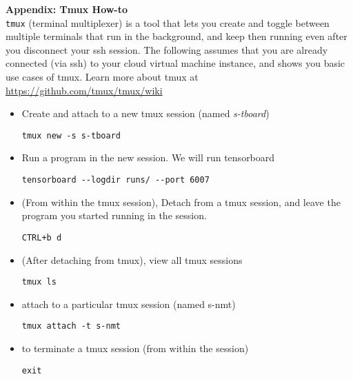 \newpage
\clearpage
\Large{\textbf{Appendix: Tmux How-to}}\\
\normalsize
\texttt{tmux} (terminal multiplexer) is a tool that lets you create and toggle between multiple terminals that run in the background, and keep then running even after you disconnect your ssh session.
%
The following assumes that you are already connected (via ssh) to your cloud virtual machine instance, and shows you basic use cases of tmux. Learn more about tmux at \href{https://github.com/tmux/tmux/wiki}{https://github.com/tmux/tmux/wiki}

\begin{itemize}
    \item  Create and attach to a new tmux session (named \emph{s-tboard})
\begin{lstlisting}
tmux new -s s-tboard
\end{lstlisting}
    \item Run a program in the new session. We will run tensorboard
\begin{lstlisting}
tensorboard --logdir runs/ --port 6007
\end{lstlisting}

\item (From within the tmux session), Detach from a tmux session, and leave the program you started running in the session.
\begin{lstlisting}
CTRL+b d
\end{lstlisting}

\item (After detaching from tmux), view all tmux sessions 
\begin{lstlisting}
tmux ls
\end{lstlisting}


\item attach to a particular tmux session (named s-nmt)
\begin{lstlisting}
tmux attach -t s-nmt
\end{lstlisting}

\item to terminate a tmux session (from within the session)
\begin{lstlisting}
exit
\end{lstlisting}

\end{itemize}
